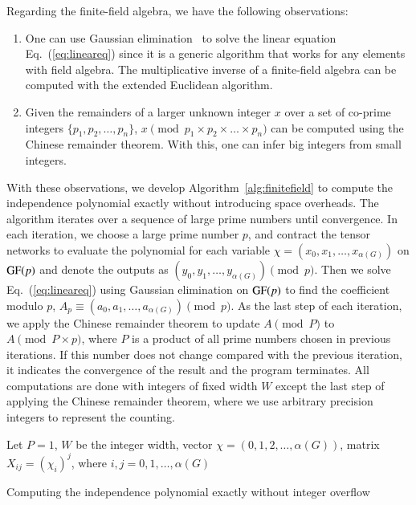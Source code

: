 \documentclass[onefignum, onetabnum]{siamart190516}
\newcommand{\<}{\langle}
\renewcommand{\>}{\rangle}
\newcommand{\Eq}[1]{Eq.~(\ref{#1})}
\begin{document}
Regarding the finite-field algebra, we have the following observations:
\begin{enumerate}
    \item One can use Gaussian elimination~\cite{Golub2013} to solve the linear equation \Eq{eq:lineareq} since it is a generic algorithm that works for any elements with field algebra. The multiplicative inverse of a finite-field algebra can be computed with the extended Euclidean algorithm.
    \item Given the remainders of a larger unknown integer $x$ over a set of co-prime integers $\{p_1, p_2, \ldots, p_n\}$,
    $x \pmod {p_1 \times p_2 \times \ldots \times p_n}$ can be computed using the Chinese remainder theorem. With this, one can infer big integers from small integers.
\end{enumerate}
With these observations, we develop Algorithm~\ref{alg:finitefield} to compute the independence polynomial exactly without introducing space overheads.
The algorithm iterates over a sequence of large prime numbers until convergence.
In each iteration, we choose a large prime number $p$, and contract the tensor networks to evaluate the polynomial for each variable $\chi = (x_{0}, x_{1}, \ldots, x_{\alpha(G)})$ on ${\rm GF}(p)$ and denote the outputs as $(y_0, y_1, \ldots, y_{\alpha(G)}) \pmod p$.
Then we solve \Eq{eq:lineareq} using Gaussian elimination on ${\rm GF}(p)$ to find the coefficient modulo $p$, $A_p \equiv (a_0, a_1, \ldots, a_{\alpha(G)})\pmod p$.
As the last step of each iteration, we apply the Chinese remainder theorem to update $A \pmod P $ to $ A \pmod {P\times p}$, where $P$ is a product of all prime numbers chosen in previous iterations.
If this number does not change compared with the previous iteration, it indicates the convergence of the result and the program terminates.
All computations are done with integers of fixed width $W$ except the last step of applying the Chinese remainder theorem, where we use arbitrary precision integers to represent the counting.

\LinesNumberedHidden
\begin{algorithm}[!ht]
    \small
    \SetAlgoNoLine
    Let $P = 1$, $W$ be the integer width, vector $\chi = (0,1,2, \ldots, \alpha(G))$, matrix $X_{ij} = (\chi_i)^j$, where $i,j = 0, 1, \ldots, \alpha(G)$\;

    \caption{Computing the independence polynomial exactly without integer overflow}\label{alg:finitefield} 
\end{algorithm}
\end{document}
